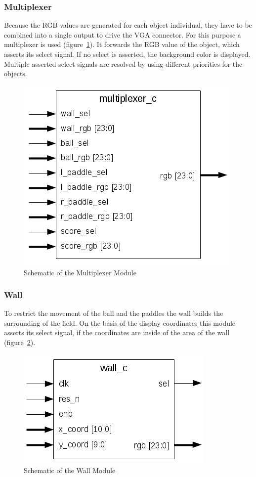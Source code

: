         \subsubsection{Multiplexer}
            Because the RGB values are generated for each object individual, they have to be combined into a single output to drive the VGA connector. For this purpose a multiplexer is used (figure~\ref{mux_sch}). It forwards the RGB value of the object, which asserts its select signal. If no select is asserted, the background color is displayed. Multiple asserted select signals are resolved by using different priorities for the objects.
	        \begin{figure}[h]
		        \centering
		        \includegraphics[scale=0.7]{images/multiplexer_schematic.png}
		        \caption{Schematic of the Multiplexer Module}
		        \label{mux_sch}
	        \end{figure}
        \subsubsection{Wall}
            To restrict the movement of the ball and the paddles the wall builds the surrounding of the field. On the basis of the display coordinates this module asserts its select signal, if the coordinates are inside of the area of the wall (figure~\ref{wall_sch}).
	        \begin{figure}[h]
		        \centering
		        \includegraphics[scale=0.7]{images/wall_schematic.png}
		        \caption{Schematic of the Wall Module}
		        \label{wall_sch}
	        \end{figure}
